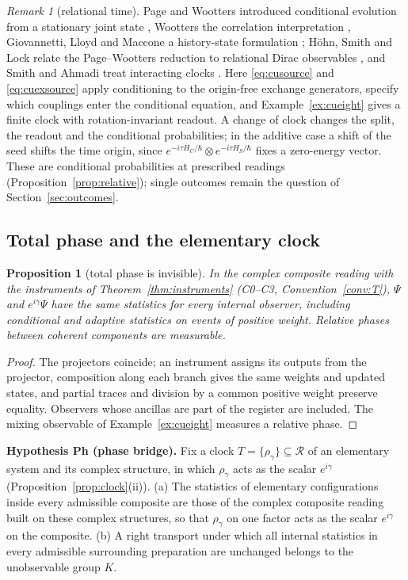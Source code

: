 \documentclass[aps,pra,onecolumn,superscriptaddress,nofootinbib,10pt]{revtex4-2}
\newtheorem{proposition}[theorem]{Proposition}
\theoremstyle{definition}
\theoremstyle{remark}
\newtheorem{remark}[theorem]{Remark}
\newcommand{\cR}{\mathcal{R}}
\begin{document}
\begin{remark}[relational time]\label{rem:cupw}
Page and Wootters introduced conditional evolution from a stationary joint state \cite{n1-pw}, Wootters
the correlation interpretation \cite{n1-wootters}, Giovannetti, Lloyd and Maccone a history-state
formulation \cite{n1-glm}; H\"ohn, Smith and Lock relate the Page--Wootters reduction to relational Dirac
observables \cite{n1-hoehn}, and Smith and Ahmadi treat interacting clocks \cite{n1-smith}.  Here
\eqref{eq:cusource} and \eqref{eq:cuexsource} apply conditioning to the origin-free exchange generators, specify which couplings
enter the conditional equation, and Example~\ref{ex:cueight} gives a finite clock with rotation-invariant readout.  A
change of clock changes the split, the readout and the conditional probabilities; in the additive case a
shift of the seed shifts the time origin, since $e^{-i\tau H_C/\hbar}\otimes e^{-i\tau H_S/\hbar}$ fixes a zero-energy vector.  These are
conditional probabilities at prescribed readings (Proposition~\ref{prop:relative}); single outcomes remain the
question of Section~\ref{sec:outcomes}.
\end{remark}

\subsection{Total phase and the elementary clock}\label{sec:cuphase}

\begin{proposition}[total phase is invisible]\label{prop:cuphase}
In the complex composite reading with the instruments of Theorem~\ref{thm:instruments} (C0--C3, Convention~\ref{conv:T}), $\Psi$ and
$e^{i\gamma}\Psi$ have the same statistics for every internal observer, including conditional and adaptive statistics
on events of positive weight.  Relative phases between coherent components are measurable.
\end{proposition}
\begin{proof}
The projectors coincide; an instrument assigns its outputs from the projector, composition along each
branch gives the same weights and updated states, and partial traces and division by a common positive
weight preserve equality.  Observers whose ancillas are part of the register are included.  The mixing
observable of Example~\ref{ex:cueight} measures a relative phase.
\end{proof}

\smallskip\noindent\textbf{Hypothesis Ph (phase bridge).}  Fix a clock $T=\{\rho_\gamma\}\subseteq\cR$ of an elementary system and its
complex structure, in which $\rho_\gamma$ acts as the scalar $e^{i\gamma}$ (Proposition~\ref{prop:clock}(ii)).  (a) The statistics of
elementary configurations inside every admissible composite are those of the complex composite reading
built on these complex structures, so that $\rho_\gamma$ on one factor acts as the scalar $e^{i\gamma}$ on the composite.
(b) A right transport under which all internal statistics in every admissible surrounding preparation
are unchanged belongs to the unobservable group $K$.
\end{document}
